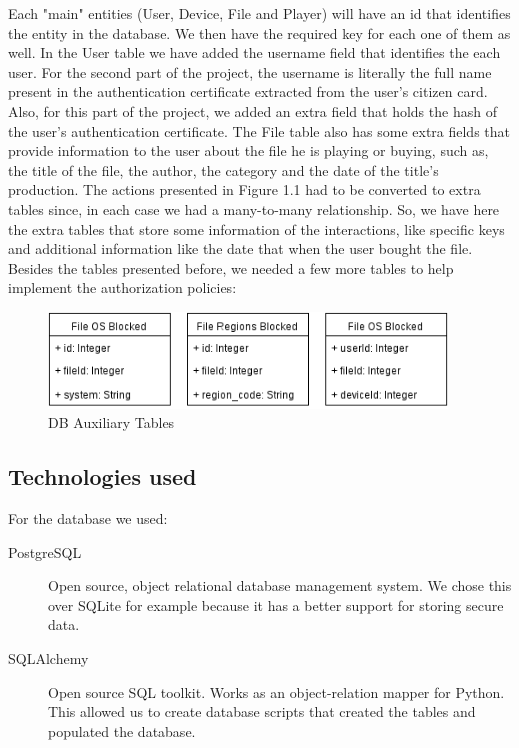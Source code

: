 \documentclass[11pt,a4paper]{report}
\begin{document}
Each "main" entities (User, Device, File and Player) will have an id that identifies the entity in the database.
We then have the required key for each one of them as well.
\newline In the User table we have added the username field that identifies the each user. For the second part of the project, the username is literally the full name present in the authentication certificate extracted from the user's citizen card. Also, for this part of the project, we added an extra field that holds the hash of the user's authentication certificate.
\newline The File table also has some extra fields that provide information to the user about the file he is playing or buying, such as, the title of the file, the author, the category and the date of the title's production.
\newline The actions presented in Figure 1.1 had to be converted to extra tables since, in each case we had a many-to-many relationship. So, we have here the extra tables that store some information of the interactions, like specific keys and additional information like the date that when the user bought the file. 
\newline Besides the tables presented before, we needed a few more tables to help implement the authorization policies:

\begin{figure}[H]
\centerline{\includegraphics[width=300pt]{images/auxTables.png}}
\caption{DB Auxiliary Tables}
\label{tables}
\end{figure}

\subsection{Technologies used}
For the database we used:
\begin{description}
  \item[PostgreSQL] Open source, object relational database management system. We chose this over SQLite for example because it has a better support for storing secure data.
  \item[SQLAlchemy] Open source SQL toolkit. Works as an object-relation mapper for Python. This allowed us to create database scripts that created the tables and populated the database.
\end{description}
\end{document}
